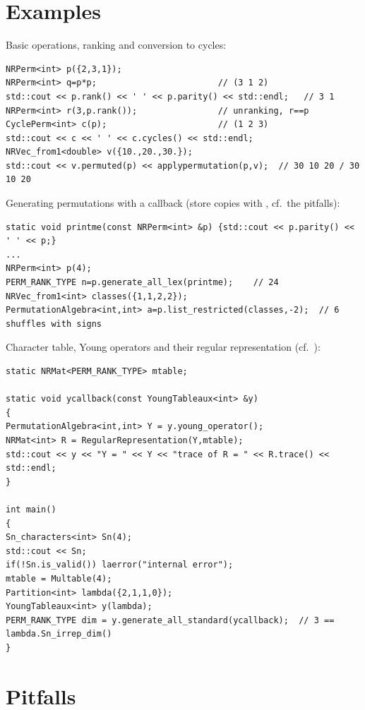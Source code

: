 \section{Examples}\label{sec:permutation:examples}

Basic operations, ranking and conversion to cycles:
\begin{lstlisting}
NRPerm<int> p({2,3,1});
NRPerm<int> q=p*p;                        // (3 1 2)
std::cout << p.rank() << ' ' << p.parity() << std::endl;   // 3 1
NRPerm<int> r(3,p.rank());                // unranking, r==p
CyclePerm<int> c(p);                      // (1 2 3)
std::cout << c << ' ' << c.cycles() << std::endl;
NRVec_from1<double> v({10.,20.,30.});
std::cout << v.permuted(p) << applypermutation(p,v);  // 30 10 20 / 30 10 20
\end{lstlisting}
Generating permutations with a callback (store copies with \code{|=}, cf.\ the pitfalls):
\begin{lstlisting}
static void printme(const NRPerm<int> &p) {std::cout << p.parity() << ' ' << p;}
...
NRPerm<int> p(4);
PERM_RANK_TYPE n=p.generate_all_lex(printme);    // 24
NRVec_from1<int> classes({1,1,2,2});
PermutationAlgebra<int,int> a=p.list_restricted(classes,-2);  // 6 shuffles with signs
\end{lstlisting}
Character table, Young operators and their regular representation (cf.\ ):
\begin{lstlisting}
static NRMat<PERM_RANK_TYPE> mtable;

static void ycallback(const YoungTableaux<int> &y)
{
PermutationAlgebra<int,int> Y = y.young_operator();
NRMat<int> R = RegularRepresentation(Y,mtable);
std::cout << y << "Y = " << Y << "trace of R = " << R.trace() << std::endl;
}

int main()
{
Sn_characters<int> Sn(4);
std::cout << Sn;
if(!Sn.is_valid()) laerror("internal error");
mtable = Multable(4);
Partition<int> lambda({2,1,1,0});
YoungTableaux<int> y(lambda);
PERM_RANK_TYPE dim = y.generate_all_standard(ycallback);  // 3 == lambda.Sn_irrep_dim()
}
\end{lstlisting}

\section{Pitfalls}\label{sec:permutation:pitfalls}

